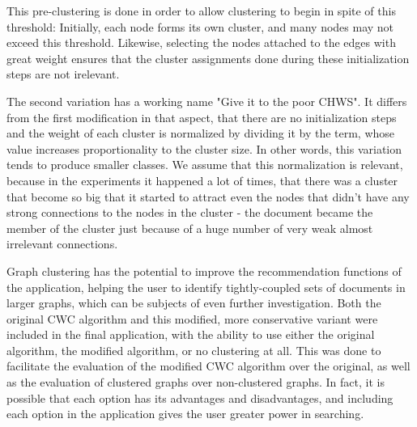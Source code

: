 This pre-clustering is done in order to allow clustering to begin in spite of this threshold: Initially, each node forms its own cluster, and many nodes may not exceed this threshold. Likewise, selecting the nodes attached to the edges with great weight ensures that the cluster assignments done during these initialization steps are not irelevant.

The second variation has a working name "Give it to the poor CHWS". It differs from the first modification in that aspect, that there are no initialization steps and the weight of each cluster is normalized by dividing it by the term, whose value increases proportionality to the cluster size. In other words, this variation tends to produce smaller classes. We assume that this normalization is relevant, because in the experiments it happened a lot of times, that there was a cluster that become so big that it started to attract even the nodes that didn't have any strong connections to the nodes in the cluster - the document became the member of the cluster just because of a huge number of very weak almost irrelevant connections.

Graph clustering has the potential to improve the recommendation functions of the application, helping the user to identify tightly-coupled sets of documents in larger graphs, which can be subjects of even further investigation. Both the original CWC algorithm and this modified, more conservative variant were included in the final application, with the ability to use either the original algorithm, the modified algorithm, or no clustering at all. This was done to facilitate the evaluation of the modified CWC algorithm over the original, as well as the evaluation of clustered graphs over non-clustered graphs. In fact, it is possible that each option has its advantages and disadvantages, and including each option in the application gives the user greater power in searching.
